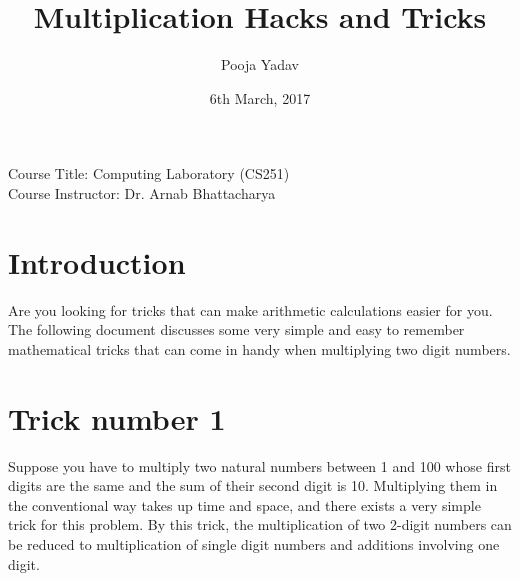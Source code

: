 \documentclass[12pt, a4paper]{article}
\title{Multiplication Hacks and Tricks}
\author{Pooja Yadav}
\date{6th March, 2017}
\begin{document}
\begin{titlepage}
\maketitle
\vspace{4cm}
\centering
Course Title: Computing Laboratory (CS251)\\
Course Instructor: Dr. Arnab Bhattacharya
\end{titlepage}
\section{Introduction}
Are you looking for tricks that can make arithmetic calculations easier for you. The following document discusses some very simple and easy to remember mathematical tricks that can come in handy when multiplying two digit numbers.
\section{Trick number 1}
\label{sec1}
Suppose you have to multiply two natural numbers between 1 and 100 whose first digits are the same and the sum of their second digit is 10. Multiplying them in the conventional way takes up time and space, and there exists a very simple trick for this problem. By this trick, the multiplication of two 2-digit numbers can be reduced to multiplication of single digit numbers and additions involving one digit.
\end{document}
